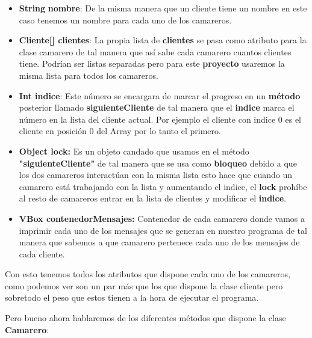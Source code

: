 \documentclass{article}
\begin{document}
\begin{itemize}
    \item \textbf{String} \textbf{nombre}: De la misma manera que un cliente tiene un nombre en este caso tenemos un nombre para cada uno de los camareros.
    \item \textbf{Cliente[] clientes}: La propia lista de \textbf{clientes} se pasa como atributo para la clase camarero de tal manera que así sabe cada camarero cuantos clientes tiene. Podrían ser listas separadas pero para este \textbf{proyecto} usaremos la misma lista para todos los camareros.
    \item \textbf{Int indice}: Este número se encargara de marcar el progreso en un \textbf{método} posterior llamado \textbf{siguienteCliente} de tal manera que el \textbf{indice} marca el número en la lista del cliente actual. Por ejemplo el cliente con indice 0 es el cliente en posición 0 del Array por lo tanto el primero.
    \item \textbf{Object lock:} Es un objeto candado que usamos en el método \textbf{"siguienteCliente"} de tal manera que se usa como \textbf{bloqueo} debido a que los dos camareros interactúan con la misma lista esto hace que cuando un camarero está trabajando con la lista y aumentando el indice, el \textbf{lock} prohíbe al resto de camareros entrar en la lista de clientes y modificar el \textbf{indice}.
    \item \textbf{VBox contenedorMensajes:} Contenedor de cada camarero donde vamos a imprimir cada uno de los mensajes que se generan en nuestro programa de tal manera que sabemos a que camarero pertenece cada uno de los mensajes de cada cliente.
\end{itemize}

Con esto tenemos todos los atributos que dispone cada uno de los camareros, como podemos ver son un par más que los que dispone la clase cliente pero sobretodo el peso que estos tienen a la hora de ejecutar el programa.

Pero bueno ahora hablaremos de los diferentes métodos que dispone la clase \textbf{Camarero}: 
\end{document}
